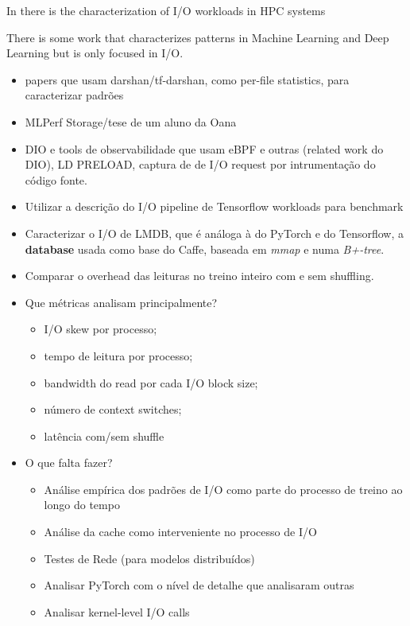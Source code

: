 \documentclass[conference]{IEEEtran}
\begin{document}
In there is the characterization of I/O workloads in HPC systems

There is some work that characterizes patterns in Machine Learning \cite{OanaML} and Deep Learning \cite{OanaDL} but is only focused in I/O.

\begin{itemize}
    \item papers que usam darshan/tf-darshan, como per-file statistics, para caracterizar padrões \cite{9229605} \cite{zoomin} 
    \item MLPerf Storage/tese de um aluno da Oana
    \item DIO e tools de observabilidade que usam eBPF e outras (related work do DIO), LD PRELOAD, captura de de I/O request por intrumentação do código fonte.
    \item Utilizar a descrição do I/O pipeline de Tensorflow workloads para benchmark \cite{8638422}
    \item Caracterizar o I/O de LMDB, que é análoga à do PyTorch e do Tensorflow, a \textbf{database} usada como base do Caffe, baseada em \textit{mmap} e numa \textit{B+-tree}. \cite{LMDB}
    \item Comparar o overhead das leituras no treino inteiro com e sem shuffling. \cite{initial}
    \item Que métricas analisam principalmente?
    \begin{itemize}
        \item I/O skew por processo;
        \item tempo de leitura por processo;
        \item bandwidth do read por cada I/O block size;
        \item número de context switches;
        \item latência com/sem shuffle
    \end{itemize} 
    \item O que falta fazer?
    \begin{itemize}
        \item Análise empírica dos padrões de I/O como parte do processo de treino ao longo do tempo
        \item Análise da cache como interveniente no processo de I/O
        \item Testes de Rede (para modelos distribuídos)
        \item Analisar PyTorch com o nível de detalhe que analisaram outras
        \item Analisar kernel-level I/O calls 
    \end{itemize}
\end{itemize}
\end{document}
